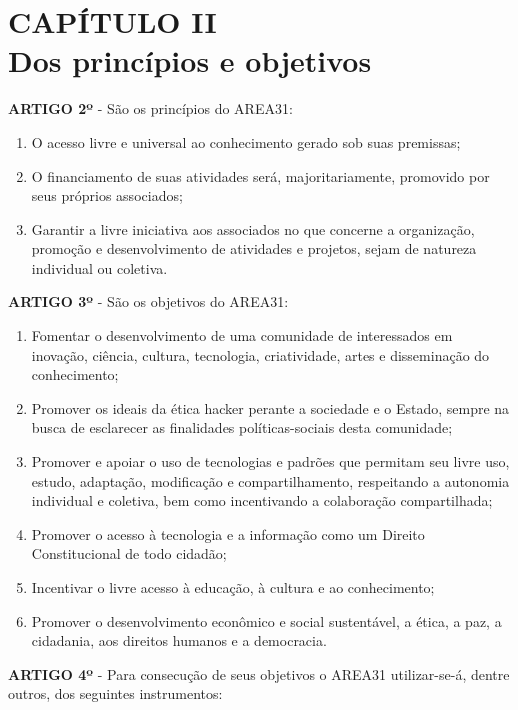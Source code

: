 \chapter*{CAPÍTULO II \\ Dos princípios e objetivos}


\textbf{ARTIGO 2º} - São os princípios do AREA31:

\begin{enumerate}[label=\Roman* -]
    \item O acesso livre e universal ao conhecimento gerado 
          sob suas premissas;
    \item O financiamento de suas atividades será, majoritariamente, 
          promovido por seus próprios associados;
    \item Garantir a livre iniciativa aos associados no que concerne a 
          organização, promoção e desenvolvimento de atividades e 
          projetos, sejam de natureza individual ou coletiva.
\end{enumerate}


\textbf{ARTIGO 3º} - São os objetivos do AREA31:

\begin{enumerate}[label=\Roman* -]
    \item Fomentar o desenvolvimento de uma comunidade de interessados em 
          inovação, ciência, cultura, tecnologia, criatividade, artes 
          e disseminação do conhecimento;
    \item Promover os ideais da ética hacker perante a sociedade e o 
          Estado, sempre na busca de esclarecer as finalidades 
          políticas-sociais desta comunidade;
    \item Promover e apoiar o uso de tecnologias e padrões que permitam 
          seu livre uso, estudo, adaptação, modificação e compartilhamento, 
          respeitando a autonomia individual e coletiva, bem como 
          incentivando a colaboração compartilhada;
    \item Promover o acesso à tecnologia e a informação como um Direito 
           Constitucional de todo cidadão;
    \item Incentivar o livre acesso à educação, à cultura e ao conhecimento;
    \item Promover o desenvolvimento econômico e social sustentável, a 
          ética, a paz, a cidadania, aos direitos humanos e a democracia.
\end{enumerate}


\textbf{ARTIGO 4º} - Para consecução de seus objetivos o AREA31 utilizar-se-á, 
dentre outros, dos seguintes instrumentos:

